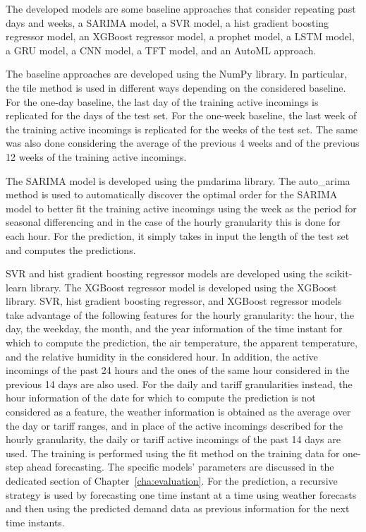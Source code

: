 The developed models are some baseline approaches that consider repeating past days and weeks, a SARIMA model, a SVR model, a hist gradient boosting regressor model, an XGBoost regressor model, a prophet model, a LSTM model, a GRU model, a CNN model, a TFT model, and an AutoML approach.

The baseline approaches are developed using the NumPy library.
In particular, the tile method is used in different ways depending on the considered baseline.
For the one-day baseline, the last day of the training active incomings is replicated for the days of the test set.
For the one-week baseline, the last week of the training active incomings is replicated for the weeks of the test set.
The same was also done considering the average of the previous 4 weeks and of the previous 12 weeks of the training active incomings.

The SARIMA model is developed using the pmdarima library.
The auto\_arima method is used to automatically discover the optimal order for the SARIMA model to better fit the training active incomings using the week as the period for seasonal differencing and in the case of the hourly granularity this is done for each hour.
For the prediction, it simply takes in input the length of the test set and computes the predictions.

SVR and hist gradient boosting regressor models are developed using the scikit-learn library.
The XGBoost regressor model is developed using the XGBoost library.
SVR, hist gradient boosting regressor, and XGBoost regressor models take advantage of the following features for the hourly granularity: the hour, the day, the weekday, the month, and the year information of the time instant for which to compute the prediction, the air temperature, the apparent temperature, and the relative humidity in the considered hour.
In addition, the active incomings of the past 24 hours and the ones of the same hour considered in the previous 14 days are also used.
For the daily and tariff granularities instead, the hour information of the date for which to compute the prediction is not considered as a feature, the weather information is obtained as the average over the day or tariff ranges, and in place of the active incomings described for the hourly granularity, the daily or tariff active incomings of the past 14 days are used.
The training is performed using the fit method on the training data for one-step ahead forecasting.
The specific models' parameters are discussed in the dedicated section of Chapter~\ref{cha:evaluation}.
For the prediction, a recursive strategy is used by forecasting one time instant at a time using weather forecasts and then using the predicted demand data as previous information for the next time instants.

